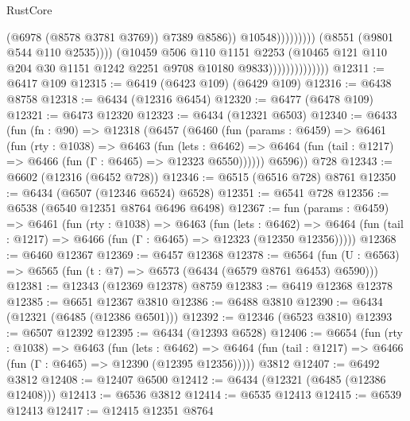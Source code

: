 \begin{lexlean}{RustCore}
\begin{coremodule}
                                                      (@6978 (@8578 @3781 @3769))
                                                      @7389
                                                      @8586))
                                                  @10548)))))))))
                                (@8551 (@9801 @544 @110 @2535))))
                            (@10459
                              @506
                              @110
                              @1151
                              @2253
                              (@10465
                                @121
                                @110
                                @204
                                @30
                                @1151
                                @1242
                                @2251
                                @9708
                                @10180
                                @9833))))))))))))))
@12311 := @6417 @109
@12315 := @6419 (@6423 @109) (@6429 @109)
@12316 := @6438 @8758
@12318 := @6434 (@12316 @6454)
@12320 := @6477 (@6478 @109)
@12321 := @6473 @12320
@12323 := @6434 (@12321 @6503)
@12340 := @6433
    (fun (fn : @90) =>
    @12318
      (@6457
        (@6460
          (fun (params : @6459) =>
          @6461
            (fun (rty : @1038) =>
            @6463
              (fun (lets : @6462) =>
              @6464 (fun (tail : @1217) => @6466 (fun (Γ : @6465) => @12323 @6550))))))
        @6596))
    @728
@12343 := @6602 (@12316 (@6452 @728))
@12346 := @6515 (@6516 @728) @8761
@12350 := @6434 (@6507 (@12346 @6524) @6528)
@12351 := @6541 @728
@12356 := @6538 (@6540 @12351 @8764 @6496 @6498)
@12367 := fun (params : @6459) =>
  @6461
    (fun (rty : @1038) =>
    @6463
      (fun (lets : @6462) =>
      @6464 (fun (tail : @1217) => @6466 (fun (Γ : @6465) => @12323 (@12350 @12356)))))
@12368 := @6460 @12367
@12369 := @6457 @12368
@12378 := @6564 (fun (U : @6563) => @6565 (fun (t : @7) => @6573 (@6434 (@6579 @8761 @6453) @6590)))
@12381 := @12343 (@12369 @12378) @8759
@12383 := @6419 @12368 @12378
@12385 := @6651 @12367 @3810
@12386 := @6488 @3810
@12390 := @6434 (@12321 (@6485 (@12386 @6501)))
@12392 := @12346 (@6523 @3810)
@12393 := @6507 @12392
@12395 := @6434 (@12393 @6528)
@12406 := @6654
    (fun (rty : @1038) =>
    @6463
      (fun (lets : @6462) =>
      @6464 (fun (tail : @1217) => @6466 (fun (Γ : @6465) => @12390 (@12395 @12356)))))
    @3812
@12407 := @6492 @3812
@12408 := @12407 @6500
@12412 := @6434 (@12321 (@6485 (@12386 @12408)))
@12413 := @6536 @3812
@12414 := @6535 @12413
@12415 := @6539 @12413
@12417 := @12415 @12351 @8764

\end{coremodule}
\end{lexlean}
